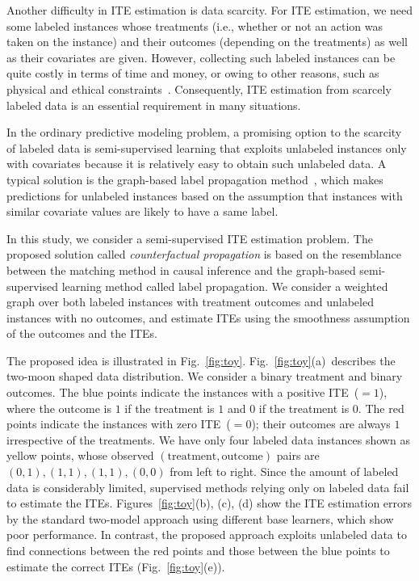 Another difficulty in ITE estimation is data scarcity.
For ITE estimation, we need some labeled instances whose treatments (i.e., whether or not an action was taken on the instance) and their outcomes (depending on the treatments) as well as their covariates are given.
However, collecting such labeled instances can be quite costly in terms of time and money, or owing to other reasons, such as physical and ethical constraints~\cite{radlinski2005query,pombo2015machine}. 
Consequently, ITE estimation from scarcely labeled data is an essential requirement in many situations.

In the ordinary predictive modeling problem, a promising option to the scarcity of labeled data is semi-supervised learning that exploits unlabeled instances only with covariates because it is relatively easy to obtain such unlabeled data. 
A typical solution is the graph-based label propagation method~\cite{zhu2002learning,belkin2006manifold,weston2012deep}, which makes predictions for unlabeled instances based on the assumption that instances with similar covariate values are likely to have a same label.

In this study, we consider a semi-supervised ITE estimation problem.
The proposed solution called {\it counterfactual propagation} is based on the resemblance between the matching method in causal inference and the graph-based semi-supervised learning method called label propagation.
We consider a weighted graph over both labeled instances with treatment outcomes and unlabeled instances with no outcomes, and estimate ITEs using the smoothness assumption of the outcomes and the ITEs.

The proposed idea is illustrated in Fig.~\ref{fig:toy}.
Fig.~\ref{fig:toy}(a)~describes the two-moon shaped data distribution. 
We consider a binary treatment and binary outcomes.
The blue points indicate the instances with a positive ITE~($=1$), where the outcome is $1$ if the treatment is $1$ and $0$ if the treatment is $0$. 
The red points indicate the instances with zero ITE~($=0$); their outcomes are always $1$ irrespective of the treatments.
We have only four labeled data instances shown as yellow points, whose observed $(\text{treatment}, \text{outcome})$ pairs are $(0, 1), (1, 1), (1, 1), (0,0)$ from left to right. 
Since the amount of labeled data is considerably limited,
supervised methods relying only on labeled data fail to estimate the ITEs.
Figures~\ref{fig:toy}(b), (c), (d) show the ITE estimation errors by the standard two-model approach using different base learners, which show poor performance. 
In contrast, the proposed approach exploits unlabeled data to find connections between the red points and those between the blue points to estimate the correct ITEs (Fig.~\ref{fig:toy}(e)).

